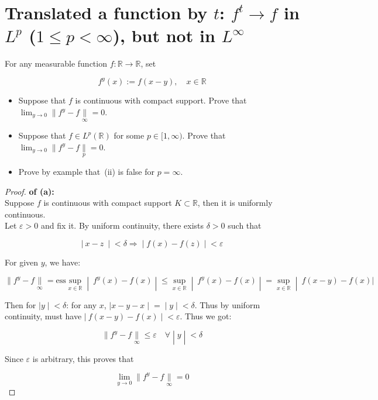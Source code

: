 \section{\texorpdfstring{Translated a function by \(t\): \(f^{t}\rightarrow f\) in \(L^{p}\) (\(1 \leq p < \infty\)), but not in \(L^{\infty}\)}{Translated a function by t: f\^{}\{t\}\textbackslash rightarrow f in L\^{}\{p\} (1 \textbackslash leq p \textless{} \textbackslash infty), but not in L\^{}\{\textbackslash infty\}}}\label{translated-a-function-by-t-ft-to-f-in-lp-1leq-p-infty-but-not-in-linfty}

For any measurable function \(f:\mathbb{R}\rightarrow\mathbb{R}\), set

\[f^{y}(x) := f(x - y),\quad x \in \mathbb{R}\]

\begin{itemize}
\item
  Suppose that \(f\) is continuous with compact support. Prove that \(\lim_{y\rightarrow 0} \parallel f^{y} - f\underset{\infty}{\parallel} = 0\).
\item
  Suppose that \(f \in L^{p}(\mathbb{R})\) for some \(p \in \lbrack 1,\infty)\). Prove that \(\lim_{y\rightarrow 0} \parallel f^{y} - f\underset{p}{\parallel} = 0\).
\item
  Prove by example that~(ii) is false for \(p = \infty\).
\end{itemize}

\begin{proof}

\textbf{of (a):}\\
Suppose \(f\) is continuous with compact support \(K \subset \mathbb{R}\), then it is uniformly continuous.\\
Let \(\varepsilon > 0\) and fix it. By uniform continuity, there exists \(\delta > 0\) such that

\[\left. |\ x - z\  \middle| < \delta\Longrightarrow \middle| f(x) - f(z) \middle| < \varepsilon \right.\]

For given \(y\), we have:

\[\left. \parallel f^{y} - f\underset{\infty}{\parallel} = \text{ess}\sup\limits_{x \in \mathbb{R}} \middle| \ f^{y}(x) - f(x) \middle| \leq \sup\limits_{x \in \mathbb{R}} \middle| \ f^{y}(x) - f(x) \middle| = \sup\limits_{x \in \mathbb{R}} \middle| \ f(x - y) - f(x)| \right.\]

Then for \(\left. |y \middle| < \delta \right.\): for any \(x\), \(\left. |x - y - x \middle| = \middle| y \middle| < \delta \right.\). Thus by uniform continuity, must have \(\left. |\ f(x - y) - f(x) \middle| < \varepsilon \right.\). Thus we got:

\[\left. \parallel f^{y} - f\underset{\infty}{\parallel} \leq \varepsilon\quad\forall \middle| y \middle| < \delta \right.\]

Since \(\varepsilon\) is arbitrary, this proves that

\[\lim\limits_{y\rightarrow 0} \parallel f^{y} - f\underset{\infty}{\parallel} = 0\]

\end{proof}

